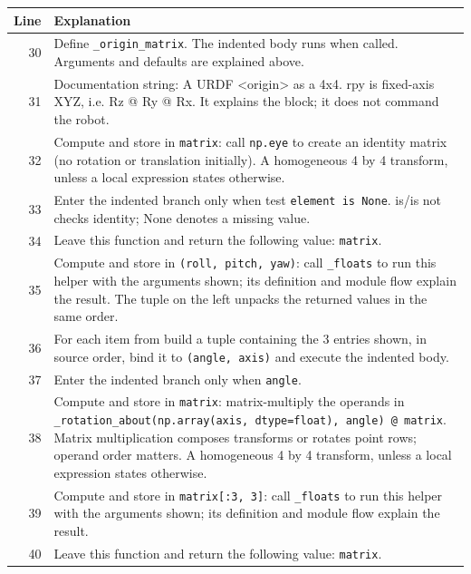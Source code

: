 \documentclass[11pt,a4paper]{book}
\begin{document}
\begin{longtable}{r p{}}

\textbf{Line} & \textbf{Explanation} \\ \hline \endhead

30 & Define \texttt{\_origin\_matrix}. The indented body runs when called. Arguments and defaults are explained above. \\

31 & Documentation string: A URDF <origin> as a 4x4. rpy is fixed-axis XYZ, i.e. Rz @ Ry @ Rx. It explains the block; it does not command the robot. \\

32 & Compute and store in \texttt{matrix}: call \texttt{np.eye} to create an identity matrix (no rotation or translation initially). A homogeneous 4 by 4 transform, unless a local expression states otherwise. \\

33 & Enter the indented branch only when test \texttt{element is None}. is/is not checks identity; None denotes a missing value. \\

34 & Leave this function and return the following value: \texttt{matrix}. \\

35 & Compute and store in \texttt{(roll, pitch, yaw)}: call \texttt{\_floats} to run this helper with the arguments shown; its definition and module flow explain the result. The tuple on the left unpacks the returned values in the same order. \\

36 & For each item from build a tuple containing the 3 entries shown, in source order, bind it to \texttt{(angle, axis)} and execute the indented body. \\

37 & Enter the indented branch only when \texttt{angle}. \\

38 & Compute and store in \texttt{matrix}: matrix-multiply the operands in \texttt{\_rotation\_about(np.array(axis, dtype=float), angle) @ matrix}. Matrix multiplication composes transforms or rotates point rows; operand order matters. A homogeneous 4 by 4 transform, unless a local expression states otherwise. \\

39 & Compute and store in \texttt{matrix[:3, 3]}: call \texttt{\_floats} to run this helper with the arguments shown; its definition and module flow explain the result.  \\

40 & Leave this function and return the following value: \texttt{matrix}. \\

\end{longtable}
\end{document}
